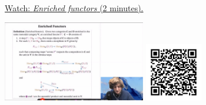 
\begin{minipage}{10cm}
    \href{https://act4e-spring21.netlify.app/videos/spring2021-enrichment:enriched-functors.html}{Watch: \emph{Enriched functors} (2 minutes).}
        
    \href{https://act4e-spring21.netlify.app/videos/spring2021-enrichment:enriched-functors.html}{\includegraphics[height=3.5cm]{spring2021-enrichment:enriched-functors/thumbnails.jpg}}
    \href{https://act4e-spring21.netlify.app/videos/spring2021-enrichment:enriched-functors.html}{\includegraphics[height=2.5cm]{spring2021-enrichment:enriched-functors/qrcode.png}}
\end{minipage}
